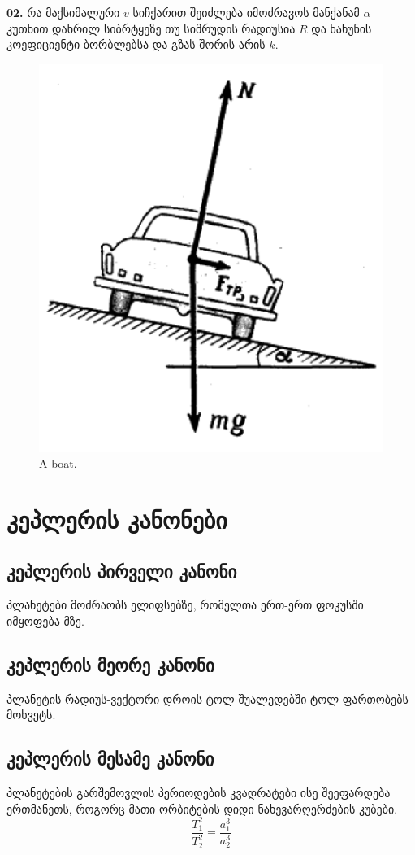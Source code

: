 \documentclass[a4paper]{article}
\begin{document}
	\textbf{02.} რა მაქსიმალური $v$ სიჩქარით შეიძლება იმოძრავოს მანქანამ $\alpha$ კუთხით დახრილ სიბრტყეზე თუ სიმრუდის რადიუსია $R$ და ხახუნის კოეფიციენტი ბორბლებსა და გზას შორის არის $k$.
			\begin{figure}[H]
           \includegraphics[width=\linewidth = 0.6]{figures/02}
           \caption{A boat.}
           \label{fig:boat1}
        \end{figure}
	 
	\section{კეპლერის კანონები}
	\subsection{კეპლერის პირველი კანონი}
	პლანეტები მოძრაობს ელიფსებზე, რომელთა ერთ-ერთ ფოკუსში იმყოფება მზე.
	\subsection{კეპლერის მეორე კანონი}
	პლანეტის რადიუს-ვექტორი დროის ტოლ შუალედებში ტოლ ფართობებს მოხვეტს.
	\subsection{კეპლერის მესამე კანონი}
	პლანეტების გარშემოვლის პერიოდების კვადრატები ისე შეეფარდება ერთმანეთს, როგორც მათი ორბიტების დიდი ნახევარღერძების კუბები.
	\begin{equation}
		\frac{T_1^2}{T_2^2} = \frac{a_1^3}{a_2^3}
	\end{equation}
\end{document}

